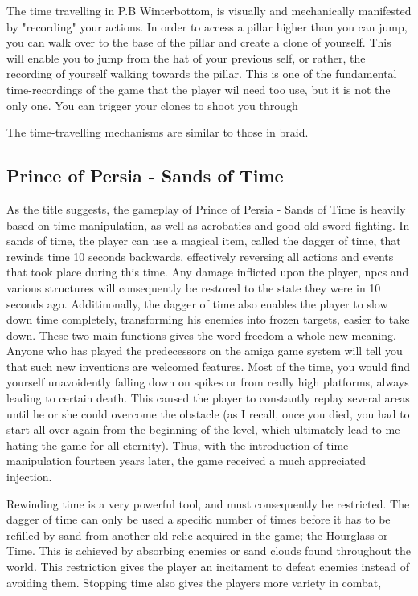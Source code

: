 The time travelling in P.B Winterbottom, is visually and mechanically manifested by "recording" your actions. In order to access a pillar higher than you can jump, 
you can walk over to the base of the pillar and create a clone of yourself. This will enable you to jump from the hat of your previous self, or rather, the recording of 
yourself walking towards the pillar. This is one of the fundamental time-recordings of the game that the player wil need too use, but it is not the only one. You can trigger your clones to shoot you through 


The time-travelling mechanisms are similar to those in braid. 

\subsection{Prince of Persia - Sands of Time}
As the title suggests, the gameplay of Prince of Persia - Sands of Time is heavily based on time manipulation, as well as acrobatics and good old sword fighting. 
In sands of time, the player can use a magical item, called the dagger of time, that rewinds time 10 seconds backwards, effectively reversing all actions and events 
that took place during this time. Any damage inflicted upon the player, npcs and various structures will consequently be restored to the state they were in 10 seconds ago.
 Additinonally, the dagger of time also enables the player to slow down time completely, transforming his enemies into frozen targets, easier to take down. These two main 
functions gives the word freedom a whole new meaning. Anyone who has played the predecessors on the amiga game system will tell you that such new inventions are 
welcomed features. Most of the time, you would find yourself unavoidently falling down on spikes or from really high platforms, always leading to certain death. 
This caused the player to constantly replay several areas until he or she could overcome the obstacle (as I recall, once you died, you had to start all over again from the
 beginning of the level, which ultimately lead to me hating the game for all eternity). Thus, with the introduction of time manipulation fourteen years later, the game received a much appreciated injection. 

Rewinding time is a very powerful tool, and must consequently be restricted. The dagger of time can only be used a specific number of times before it 
has to be refilled by sand from another old relic acquired in the game; the Hourglass or Time. This is achieved by absorbing enemies or sand clouds found 
throughout the world. This restriction gives the player an incitament to defeat enemies instead of avoiding them. Stopping time also gives the players more variety in combat, 

